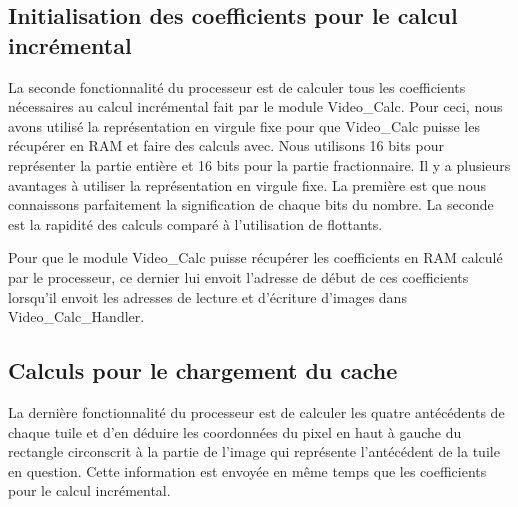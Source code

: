 {{}

			\subsection*{Initialisation des coefficients pour le calcul incrémental}

{La seconde fonctionnalité du processeur est de calculer tous les coefficients nécessaires au calcul incrémental fait par le module Video\_Calc. Pour ceci, nous avons utilisé la représentation en virgule fixe pour que Video\_Calc puisse les récupérer en RAM et faire des calculs avec. Nous utilisons 16 bits pour représenter la partie entière et 16 bits pour la partie fractionnaire. Il y a plusieurs avantages à utiliser la représentation en virgule fixe. La première est que nous connaissons parfaitement la signification de chaque bits du nombre. La seconde est la rapidité des calculs comparé à l'utilisation de flottants.


Pour que le module Video\_Calc puisse récupérer les coefficients en RAM calculé par le processeur, ce dernier lui envoit l'adresse de début de ces coefficients lorsqu'il envoit les adresses de lecture et d'écriture d'images dans Video\_Calc\_Handler.
}

			\subsection*{Calculs pour le chargement du cache}
{La dernière fonctionnalité du processeur est de calculer les quatre antécédents de chaque tuile et d'en déduire les coordonnées du pixel en haut à gauche du rectangle circonscrit à la partie de l'image qui représente l'antécédent de la tuile en question.
Cette information est envoyée en même temps que les coefficients pour le calcul incrémental.

}}
